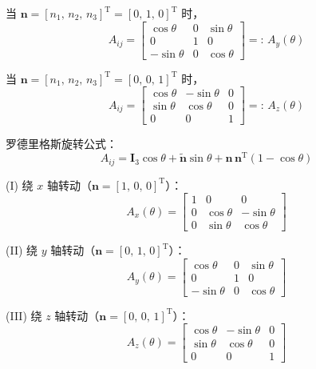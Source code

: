 当 $\boldsymbol{n} = [n_1,\, n_2,\, n_3]^{\mathrm{T}} = [0,\, 1,\, 0]^{\mathrm{T}}$ 时，
\begin{equation}\label{eq:5.Ay}
A_{ij} = \begin{bmatrix} \cos\theta & 0 & \sin\theta \\ 0 & 1 & 0 \\ -\sin\theta & 0 & \cos\theta \end{bmatrix} =:\, A_y(\theta)
\end{equation}

当 $\boldsymbol{n} = [n_1,\, n_2,\, n_3]^{\mathrm{T}} = [0,\, 0,\, 1]^{\mathrm{T}}$ 时，
\begin{equation}\label{eq:5.Az}
A_{ij} = \begin{bmatrix} \cos\theta & -\sin\theta & 0 \\ \sin\theta & \cos\theta & 0 \\ 0 & 0 & 1 \end{bmatrix} =:\, A_z(\theta)
\end{equation}


罗德里格斯旋转公式：
\begin{equation*}
A_{ij} = \boldsymbol{I}_3 \cos\theta + \tilde{\boldsymbol{n}} \sin\theta + \boldsymbol{n}\, \boldsymbol{n}^{\mathrm{T}} (1 - \cos\theta)
\end{equation*}

(I) 绕 $x$ 轴转动（$\boldsymbol{n} = [1,\, 0,\, 0]^{\mathrm{T}}$）：
\begin{equation*}
A_x(\theta) = \begin{bmatrix} 1 & 0 & 0 \\ 0 & \cos\theta & -\sin\theta \\ 0 & \sin\theta & \cos\theta \end{bmatrix}
\end{equation*}

(II) 绕 $y$ 轴转动（$\boldsymbol{n} = [0,\, 1,\, 0]^{\mathrm{T}}$）：
\begin{equation*}
A_y(\theta) = \begin{bmatrix} \cos\theta & 0 & \sin\theta \\ 0 & 1 & 0 \\ -\sin\theta & 0 & \cos\theta \end{bmatrix}
\end{equation*}

(III) 绕 $z$ 轴转动（$\boldsymbol{n} = [0,\, 0,\, 1]^{\mathrm{T}}$）：
\begin{equation*}
A_z(\theta) = \begin{bmatrix} \cos\theta & -\sin\theta & 0 \\ \sin\theta & \cos\theta & 0 \\ 0 & 0 & 1 \end{bmatrix}
\end{equation*}


